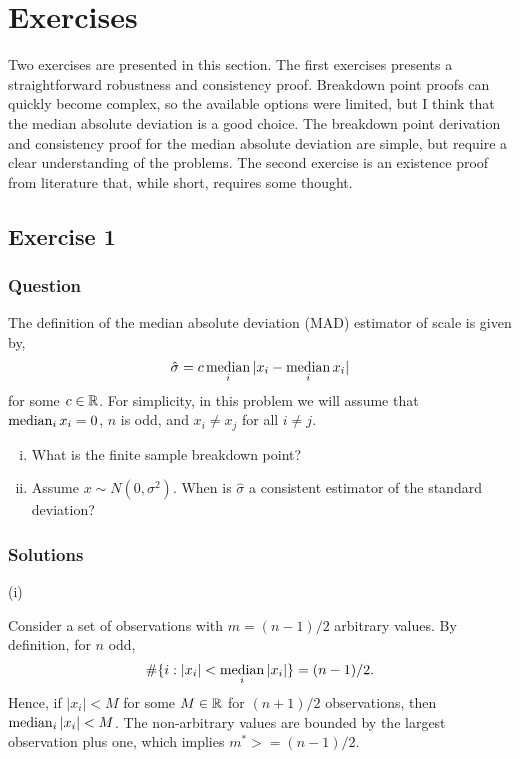 

\section{Exercises}

Two exercises are presented in this section. The first exercises presents a straightforward robustness and consistency proof. Breakdown point proofs can quickly become complex, so the available options were limited, but I think that the median absolute deviation is a good choice. The breakdown point derivation and consistency proof for the median absolute deviation are simple, but require a clear understanding of the problems. The second exercise is an existence proof from literature \cite{croux1994generalized} that, while short, requires some thought.

\subsection*{Exercise 1}

\subsubsection*{Question}

The definition of the median absolute deviation (MAD) estimator of scale is given by,
\begin{equation}
    \hat\sigma = c\operatorname*{median}_i |x_i - \operatorname*{median}_i x_i|
\end{equation}
for some $c \in \mathbb{R}$. For simplicity, in this problem we will assume that $\operatorname*{median}_i x_i = 0$, $n$ is odd, and $x_i \not= x_j$ for all $i \not= j$.
\begin{enumerate}[(i)]
    \item What is the finite sample breakdown point? 
    \item Assume $x \sim N(0,\sigma^2)$. When is $\hat\sigma$ a consistent estimator of the standard deviation?
\end{enumerate}

\subsubsection*{Solutions}

(i)

\noindent Consider a  set of observations with $m = (n-1)/2$ arbitrary values.
By definition, for $n$ odd, $$\#\{i : |x_i| < \operatorname*{median}_i |x_i|\} = (n-1)/2.$$ Hence, if $|x_i| < M$ for some $M\in\mathbb{R}$ for $(n+1)/2$ observations, then $\operatorname*{median}_i |x_i| < M$. The non-arbitrary values are bounded by the largest observation plus one, which implies $m^* >= (n-1)/2$.


